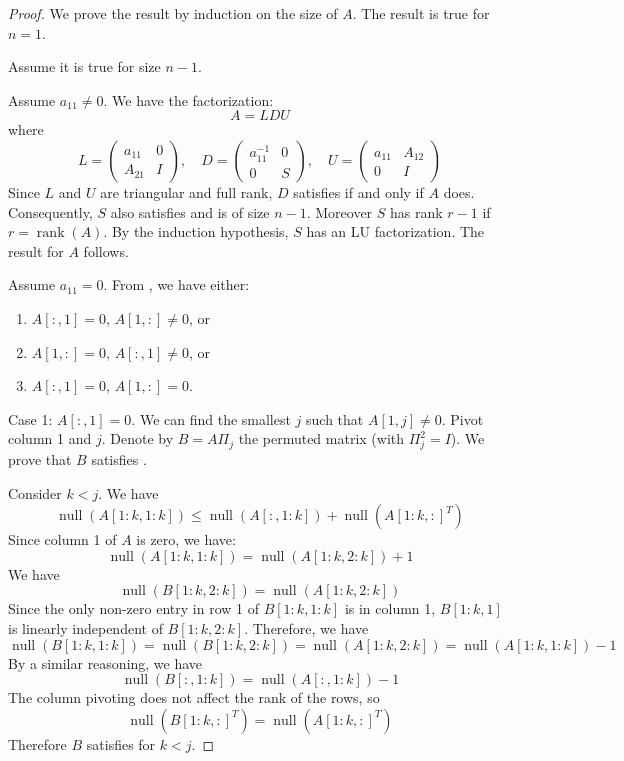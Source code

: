 \documentclass[10pt,twoside]{siamart1116}
\DeclareMathOperator{\rk}{rank}
\DeclareMathOperator{\nl}{null}
\numberwithin{theorem}{section}
\begin{document}
\begin{proof}
	We prove the result by induction on the size of $A$. The result is true for $n=1$.

	Assume it is true for size $n-1$.

	Assume $a_{11} \neq 0$. We have the factorization:
	\[
		A = LDU
	\]
	where
	\[
		L = \begin{pmatrix}
			a_{11} & 0 \\
			A_{21} & I
		\end{pmatrix}, \quad
		D = \begin{pmatrix}
			a_{11}^{-1} & 0 \\
			0           & S
		\end{pmatrix}, \quad
		U = \begin{pmatrix}
			a_{11} & A_{12} \\
			0      & I
		\end{pmatrix}
	\]
	Since $L$ and $U$ are triangular and full rank, $D$ satisfies  if and only if $A$ does. Consequently, $S$ also satisfies  and is of size $n-1$. Moreover $S$ has rank $r-1$ if $r = \rk(A)$. By the induction hypothesis, $S$ has an LU factorization. The result for $A$ follows.

	Assume $a_{11} = 0$. From , we have either:
	\begin{enumerate}
		\item $A[:,1] = 0$, $A[1,:] \ne 0$, or
		\item $A[1,:] = 0$, $A[:,1] \ne 0$, or
		\item $A[:,1] = 0$, $A[1,:] = 0$.
	\end{enumerate}

	Case 1: $A[:,1] = 0$. We can find the smallest $j$ such that $A[1,j] \neq 0$. Pivot column 1 and $j$. Denote by $B = A \Pi_j$ the permuted matrix (with $\Pi_j^2 = I$). We prove that $B$ satisfies .

	Consider $k < j$. We have
	\begin{equation} \label{eq:1}
		\nl(A[1:k,1:k]) \le \nl(A[:,1:k]) + \nl({A[1:k,:]}^T)
	\end{equation}
	Since column 1 of $A$ is zero, we have:
	\[
		\nl(A[1:k,1:k]) = \nl(A[1:k,2:k]) + 1
	\]
	We have
	\[
		\nl(B[1:k,2:k]) = \nl(A[1:k,2:k])
	\]
	Since the only non-zero entry in row 1 of $B[1:k,1:k]$ is in column 1, $B[1:k,1]$ is linearly independent of $B[1:k,2:k]$. Therefore, we have
	\[
		\nl(B[1:k,1:k]) = \nl(B[1:k,2:k]) = \nl(A[1:k,2:k]) = \nl(A[1:k,1:k]) - 1
	\]
	By a similar reasoning, we have
	\[
		\nl(B[:,1:k]) = \nl(A[:,1:k]) - 1
	\]
	The column pivoting does not affect the rank of the rows, so
	\[
		\nl({B[1:k,:]}^T) = \nl({A[1:k,:]}^T)
	\]
	Therefore $B$ satisfies  for $k < j$.


\end{proof}
\end{document}
